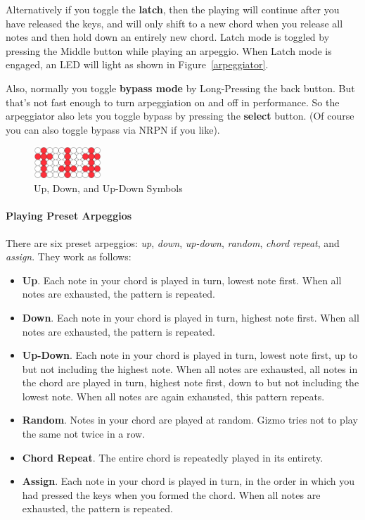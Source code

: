 \documentclass{article}
\begin{document}
Alternatively if you toggle the {\bf latch}, then the playing will continue after you have released the keys, and will only shift to a new chord when you release all notes and then hold down an entirely new chord.  Latch mode is toggled by pressing the Middle button while playing an arpeggio.  When Latch mode is engaged, an LED will light as shown in Figure~\ref{arpeggiator}.

Also, normally you toggle {\bf bypass mode} by Long-Pressing the back button.  But that's not fast enough to turn arpeggiation on and off in performance.  So the arpeggiator also lets you toggle bypass by pressing the {\bf select} button.  (Of course you can also toggle bypass via NRPN if you like). 

\begin{figure}
\begin{center}
\vspace{-4em}\includegraphics[width=1in]{updown}
\vspace{-1em}
\caption{\small Up, Down, and Up-Down Symbols}
\vspace{-3em}
\end{center}
\end{figure}


\paragraph{Playing Preset Arpeggios}

There are six preset arpeggios: {\it up}, {\it down}, {\it up-down}, {\it random}, {\it chord repeat}, and {\it assign}.  They work as follows:

\begin{itemize}
\item {\bf Up}.  Each note in your chord is played in turn, lowest note first.  When all notes are exhausted, the pattern is repeated.
\item {\bf Down}.  Each note in your chord is played in turn, highest note first.  When all notes are exhausted, the pattern is repeated.
\item {\bf Up-Down}.  Each note in your chord is played in turn, lowest note first, up to but not including the highest note.  When all notes are exhausted, all notes in the chord are played in turn, highest note first, down to but not including the lowest note.  When all notes are again exhausted, this pattern repeats.

\item {\bf Random}.  Notes in your chord are played at random.  Gizmo tries not to play the same not twice in a row.
\item {\bf Chord Repeat}.  The entire chord is repeatedly played in its entirety.
\item {\bf Assign}. Each note in your chord is played in turn, in the order in which you had pressed the keys when you formed the chord.  When all notes are exhausted, the pattern is repeated.
\end{itemize}
\end{document}
